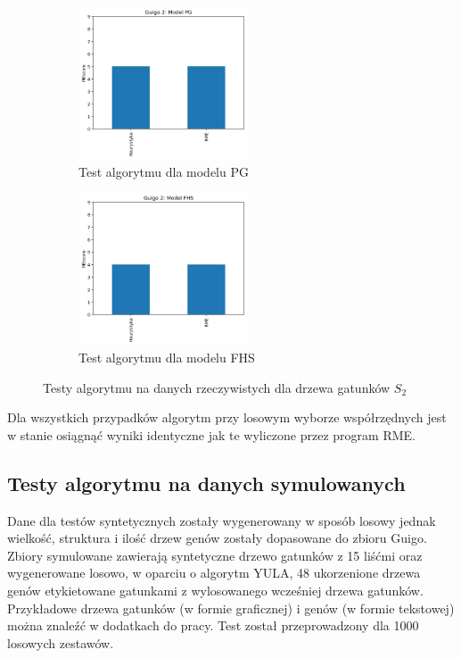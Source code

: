 \documentclass[licencjacka]{pracamgr}
\begin{document}
\begin{figure}[H]
\centering
\begin{subfigure}{.5\textwidth}
  \centering
  \includegraphics[width=50mm]{./pictures/G2_PG.png}
  \caption{Test algorytmu dla modelu PG}
\end{subfigure}%
\begin{subfigure}{.5\textwidth}
  \centering
  \includegraphics[width=50mm]{./pictures/G2_FHS.png}
  \caption{Test algorytmu dla modelu FHS}
\end{subfigure}%
\caption{Testy algorytmu na danych rzeczywistych dla drzewa gatunków $S_2$}
\end{figure}

Dla wszystkich przypadków algorytm przy losowym wyborze współrzędnych jest w stanie osiągnąć wyniki identyczne jak te wyliczone przez program RME. 

\subsection{Testy algorytmu na danych symulowanych}
Dane dla testów syntetycznych zostały wygenerowany w sposób losowy jednak wielkość, struktura i ilość drzew genów zostały dopasowane do zbioru Guigo. Zbiory symulowane zawierają syntetyczne drzewo gatunków z 15 liśćmi oraz  wygenerowane losowo, w oparciu o algorytm YULA, 48 ukorzenione drzewa genów etykietowane gatunkami z wylosowanego wcześniej drzewa gatunków. Przykładowe drzewa gatunków (w formie graficznej) i genów (w formie tekstowej) można znaleźć w dodatkach do pracy. Test został przeprowadzony dla 1000 losowych zestawów.
\end{document}
